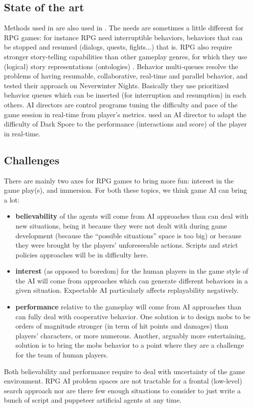 \subsection{State of the art}

Methods used in  are also used in . The needs are sometimes a little different for RPG games: for instance RPG need interruptible behaviors, behaviors that can be stopped and resumed (dialogs, quests, fights...) that is. RPG also require stronger story-telling capabilities than other gameplay genres, for which they use (logical) story representations (ontologies) \citep{kline2009,riedl11}. Behavior multi-queues \citep{Cutumisu09} resolve the problems of having resumable, collaborative, real-time and parallel behavior, and tested their approach on Neverwinter Nights. Basically they use prioritized behavior queues which can be inserted (for interruption and resumption) in each others. AI directors are control programs tuning the difficulty and pace of the game session in real-time from player's metrics. \citet{kline2011} used an AI director to adapt the difficulty of Dark Spore to the performance (interactions and score) of the player in real-time.

\subsection{Challenges}

There are mainly two axes for RPG games to bring more fun: interest in the game play(s), and immersion. For both these topics, we think game AI can bring a lot:
\begin{itemize}
    \item \textbf{believability} of the agents will come from AI approaches than can deal with new situations, being it because they were not dealt with during game development (because the ``possible situations'' space is too big) or because they were brought by the players' unforeseeable actions. Scripts and strict policies approaches will be in difficulty here. %
    \item \textbf{interest} (as opposed to boredom) for the human players in the game style of the AI will come from approaches which can generate different behaviors in a given situation. Expectable AI particularly affects replayability negatively.
    \item \textbf{performance} relative to the gameplay will come from AI approaches than can fully deal with cooperative behavior. One solution is to design mobs to be orders of magnitude stronger (in term of hit points and damages) than players' characters, or more numerous. Another, arguably more entertaining, solution is to bring the mobs behavior to a point where they are a challenge for the team of human players.
\end{itemize}
Both believability and performance require to deal with uncertainty of the game environment. RPG AI problem spaces are not tractable for a frontal (low-level) search approach nor are there few enough situations to consider to just write a bunch of script and puppeteer artificial agents at any time.

